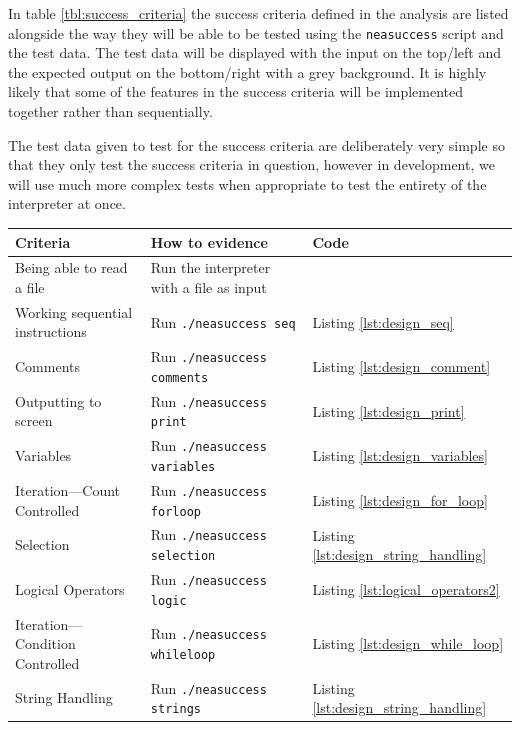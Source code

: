 \documentclass{article}
\begin{document}
In table \ref{tbl:success_criteria} the success criteria defined in the
analysis are listed alongside the way they will be able to be tested using the
\texttt{neasuccess} script and the test data. The test data will be displayed
with the input on the top/left and the expected output on the bottom/right with
a grey background. It is highly likely that some of the features in the success
criteria will be implemented together rather than sequentially.

The test data given to test for the success criteria are deliberately very
simple so that they only test the success criteria in question, however in
development, we will use much more complex tests when appropriate to test the
entirety of the interpreter at once.

\begin{table}
    \begin{adjustbox}{center}
        \begin{tabular}{|l|l|l|}
            \hline
			Criteria & How to evidence & Code \\
            \hline
            Being able to read a file & Run the interpreter with a file as input & \\
            \hline
			Working sequential instructions & Run \texttt{./neasuccess seq} & Listing \ref{lst:design_seq} \\
            \hline
			Comments & Run \texttt{./neasuccess comments} & Listing \ref{lst:design_comment} \\
            \hline
			Outputting to screen & Run \texttt{./neasuccess print} & Listing \ref{lst:design_print} \\
            \hline
			Variables & Run \texttt{./neasuccess variables} & Listing \ref{lst:design_variables} \\
            \hline
            Iteration---Count Controlled & Run \texttt{./neasuccess forloop} & Listing \ref{lst:design_for_loop} \\
            \hline
			Selection & Run \texttt{./neasuccess selection} & Listing \ref{lst:design_string_handling} \\
            \hline
			Logical Operators & Run \texttt{./neasuccess logic} & Listing \ref{lst:logical_operators2} \\
            \hline
            Iteration---Condition Controlled & Run \texttt{./neasuccess whileloop} & Listing \ref{lst:design_while_loop} \\
            \hline
			String Handling & Run \texttt{./neasuccess strings} & Listing \ref{lst:design_string_handling} \\

\end{tabular}
\end{adjustbox}
\end{table}
\end{document}
